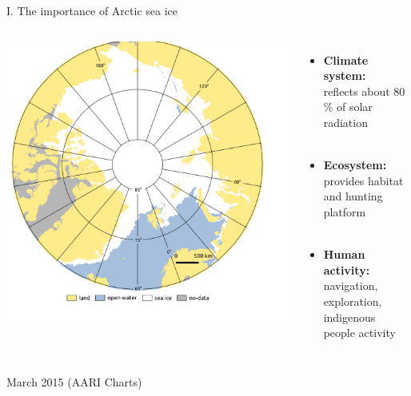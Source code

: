 \documentclass[8pt]{beamer}
\newcommand\Fontvi{\fontsize{6}{7.2}\selectfont}
\begin{document}
\setwatermark{\fontsize{125pt}{125pt}\selectfont{}}
\begin{frame}[fragile]{I. The importance of Arctic sea ice}
	\begin{columns}
			\includegraphics[width=1\textwidth]{./img/ArcticSI_Mar2015_SI.pdf}\\
	\begin{itemize}
		\item \textbf{Climate system:}\\ reflects about 80$\%$ of solar radiation\\~\\
		\item \textbf{Ecosystem:}\\ provides habitat and hunting platform\\~\\
		\item \textbf{Human activity:}\\ navigation, exploration, indigenous people activity
	\end{itemize}
	\end{columns}
\Fontvi
17 March 2015 (AARI Charts)
\end{frame}
\end{document}
